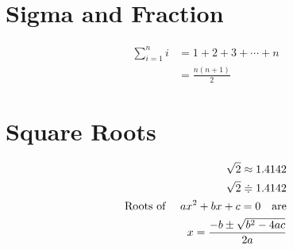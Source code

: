 \documentclass[17pt]{extarticle}
\begin{document}
\section{Sigma and Fraction}

\begin{align}
\sum_{i=1}^n i &= 1+2+3+ \cdots +n \\
			   &=\frac{n(n+1)}{2}
\end{align}
\section{Square Roots}

\begin{align}
\sqrt{2} \approx 1.4142\\
\sqrt{2} \Doteq 1.4142\\
\text{Roots of \quad} ax^2 + bx + c = 0 \text{\quad are}\\
x=\frac{-b \pm \sqrt{b^2 -4ac}}{2a}
\end{align}
\end{document}
